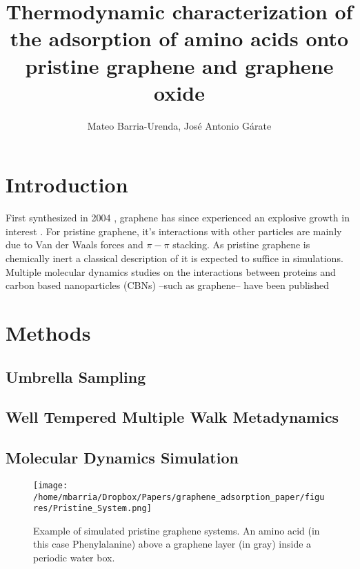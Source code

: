 \documentclass[twoside,twocolumn,9pt]{article}
\author{Mateo Barria-Urenda, José Antonio Gárate}
\title{Thermodynamic characterization of the adsorption of amino acids
  onto pristine graphene and graphene oxide}
\date{}
\begin{document}
\maketitle

\abstract{}

\section{Introduction}


First synthesized in 2004 \cite{Novoselov_2004}, graphene has since
experienced an explosive growth in interest \cite{Randviir_2014}.  For
pristine graphene, it's interactions with other particles are mainly
due to Van der Waals forces and $\pi-\pi$ stacking. \cite{Zuo_2012} As
pristine graphene is chemically inert \cite{Eftekhari_2017} a
classical description of it is expected to suffice in simulations.
Multiple molecular dynamics studies on the interactions between
proteins and carbon based nanoparticles (CBNs) --such as graphene--
have been published \cite{Zheng_2003, Ge_2011, Zuo_2012, Chong_2015,
  Duan_2015, Shityakov_2015, Al_Qattan_2018,Puigpelat_2019,
  Gonz_lez_Durruthy_2020, Li_2020}





\section{Methods}

\subsection{Umbrella Sampling}

\subsection{Well Tempered Multiple Walk Metadynamics}

\subsection{Molecular Dynamics Simulation}

\begin{figure}[htbp]
\centerline{\texttt{[image: /home/mbarria/Dropbox/Papers/graphene\_adsorption\_paper/figures/Pristine\_System.png]}}
\caption[]{\label{fig:system-pristine} Example of simulated pristine
  graphene systems. An amino acid (in this case Phenylalanine) above a
  graphene layer (in gray) inside a periodic water box.}
\end{figure}
\end{document}
